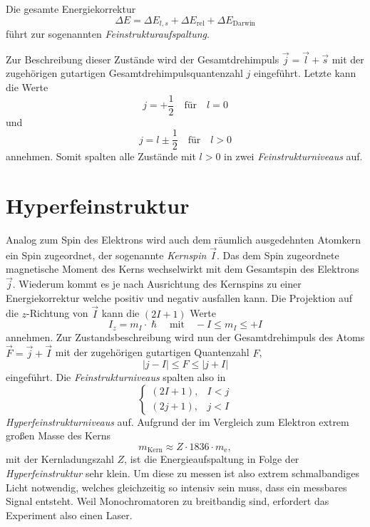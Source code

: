 \documentclass[../bericht.tex]{subfiles}
\begin{document}
      Die gesamte Energiekorrektur
      \begin{equation*}
        \Delta E = \Delta E_{l,s} + \Delta E_\mathrm{rel} + \Delta E_\mathrm{Darwin}
      \end{equation*}
      führt zur sogenannten \textit{Feinstrukturaufspaltung}.
      \medskip

      Zur Beschreibung dieser Zustände wird der Gesamtdrehimpuls $\vec{j}=\vec{l}+\vec{s}$ mit der zugehörigen gutartigen Gesamtdrehimpulsquantenzahl $j$ eingeführt. Letzte kann die Werte
      \begin{equation*}
        j=+\frac{1}{2} \quad\text{für}\quad l=0
      \end{equation*}
      und
      \begin{equation*}
        j=l\pm \frac{1}{2}\quad\text{für}\quad l>0
      \end{equation*}
      annehmen. Somit spalten alle Zustände mit $l>0$ in zwei \textit{Feinstrukturniveaus} auf.


    \section{Hyperfeinstruktur}
    \label{sec:hyperfeinstruktur}

      Analog zum Spin des Elektrons wird auch dem räumlich ausgedehnten Atomkern ein Spin zugeordnet, der sogenannte \textit{Kernspin} $\vec{I}$. Das dem Spin zugeordnete magnetische Moment des Kerns wechselwirkt mit dem Gesamtspin des Elektrons $\vec{j}$. Wiederum kommt es je nach Ausrichtung des Kernspins zu einer Energiekorrektur welche positiv und negativ ausfallen kann. Die Projektion auf die $z$-Richtung von $\vec{I}$ kann die $(2I + 1)$ Werte
      \begin{equation*}
        I_z=m_I \cdot \hslash\quad\text{mit}\quad -I\le m_I \le +I
      \end{equation*}
      annehmen. Zur Zustandsbeschreibung wird nun der Gesamtdrehimpuls des Atoms $\vec{F}=\vec{j}+\vec{I}$ mit der zugehörigen gutartigen Quantenzahl $F$,
      \begin{equation*}
        |j-I| \le F\le |j + I|
      \end{equation*}
      eingeführt. Die \textit{Feinstrukturniveaus} spalten also in
      \begin{equation*}
        \begin{cases}
            (2I+1), & I<j\\
            (2j+1), & j<I
        \end{cases}
      \end{equation*}
      \textit{Hyperfeinstrukturniveaus} auf. Aufgrund der im Vergleich zum Elektron extrem großen Masse des Kerns
      \begin{equation*}
        m_\mathrm{Kern}\approx Z\cdot 1836 \cdot m_\mathrm{e},
      \end{equation*}
      mit der Kernladungszahl $Z$, ist die Energieaufspaltung in Folge der \textit{Hyperfeinstruktur} sehr klein. Um diese zu messen ist also extrem schmalbandiges Licht notwendig, welches gleichzeitig so intensiv sein muss, dass ein messbares Signal entsteht. Weil Monochromatoren zu breitbandig sind, erfordert das Experiment also einen Laser.
\end{document}
